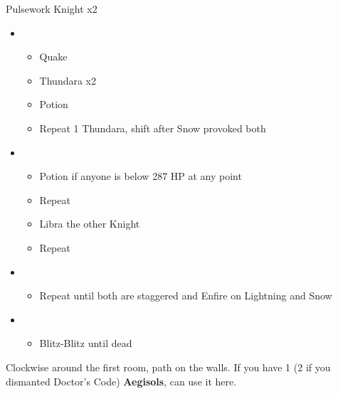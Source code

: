 	\begin{battle}[0:37]{Pulsework Knight x2}
		\begin{itemize}
			\item \first
			      \begin{itemize}
				      \item Quake
				      \item Thundara x2
				      \item Potion
				      \item Repeat 1 Thundara, shift after Snow provoked both
			      \end{itemize}
			\item \second
			      \begin{itemize}
				      \item Potion if anyone is below 287 HP at any point
				      \item Repeat
				      \item Libra the other Knight
				      \item Repeat
			      \end{itemize}
			\item \fifth
			      \begin{itemize}
				      \item Repeat until both are staggered and Enfire on Lightning and Snow
			      \end{itemize}
			\item \sixth
			      \begin{itemize}
				      \item Blitz-Blitz until dead
			      \end{itemize}
		\end{itemize}
	\end{battle}
	Clockwise around the first room, path on the walls.
	If you have 1 (2 if you dismanted Doctor's Code) \textbf{Aegisols}, can use it here.
	\vfill
	\renewcommand{\first}{[1] Riot Shield (\rav/\sen/\syn)}
	\renewcommand{\second}{[2] Tri-Disaster (\rav/\rav/\rav)}
	\renewcommand{\third}{[3] Mystic Tower (\rav/\sen/\rav)}
	\renewcommand{\fourth}{[4] Mystic Tower (\rav/\sen/\rav)}
	\renewcommand{\fifth}{[5] Malevolence (\rav/\rav/\syn)}
	\renewcommand{\sixth}{[6] Aggression (\com/\com/\rav)}
